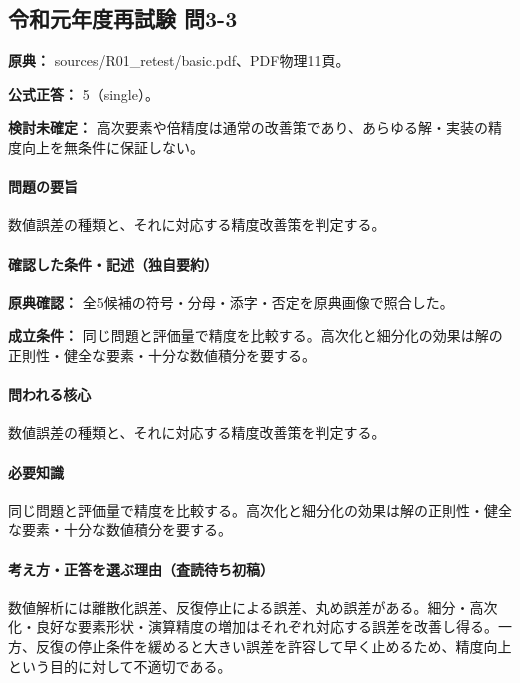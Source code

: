 \subsection{令和元年度再試験 問3-3}
\label{q:r01-ret-basic-3-3}

\noindent\textbf{原典：} sources/R01\_retest/basic.pdf、PDF物理11頁。

\textbf{公式正答：} 5（single）。

\par\textbf{検討未確定：} 高次要素や倍精度は通常の改善策であり、あらゆる解・実装の精度向上を無条件に保証しない。

\paragraph{問題の要旨} 数値誤差の種類と、それに対応する精度改善策を判定する。

\paragraph{確認した条件・記述（独自要約）}\mbox{}\par

\noindent\textbf{原典確認：} 全5候補の符号・分母・添字・否定を原典画像で照合した。\par

\noindent\textbf{成立条件：} 同じ問題と評価量で精度を比較する。高次化と細分化の効果は解の正則性・健全な要素・十分な数値積分を要する。\par

\paragraph{問われる核心} 数値誤差の種類と、それに対応する精度改善策を判定する。

\paragraph{必要知識} 同じ問題と評価量で精度を比較する。高次化と細分化の効果は解の正則性・健全な要素・十分な数値積分を要する。

\paragraph{考え方・正答を選ぶ理由（査読待ち初稿）} 数値解析には離散化誤差、反復停止による誤差、丸め誤差がある。細分・高次化・良好な要素形状・演算精度の増加はそれぞれ対応する誤差を改善し得る。一方、反復の停止条件を緩めると大きい誤差を許容して早く止めるため、精度向上という目的に対して不適切である。

